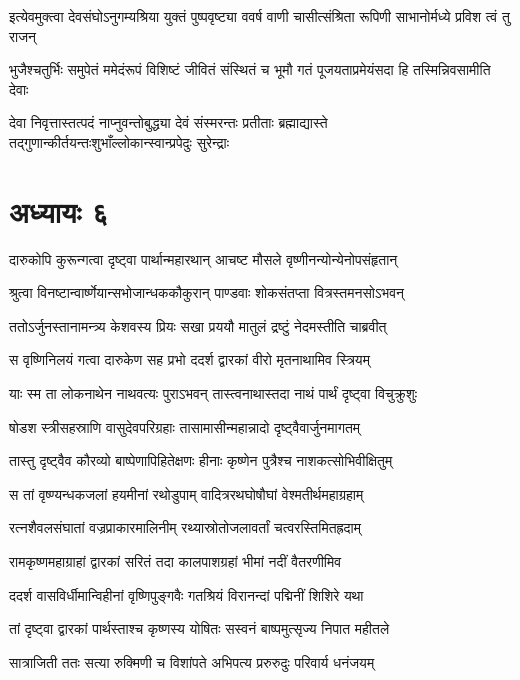 \twolineshloka
{इत्येवमुक्त्वा देवसंघोऽनुगम्यश्रिया युक्तं पुष्पवृष्ट्या ववर्ष}
{वाणी चासीत्संश्रिता रूपिणी साभानोर्मध्ये प्रविश त्वं तु राजन्}


\twolineshloka
{भुजैश्चतुर्भिः समुपेतं ममेदंरूपं विशिष्टं जीवितं संस्थितं च}
{भूमौ गतं पूजयताप्रमेयंसदा हि तस्मिन्निवसामीति देवाः}


\twolineshloka
{देवा निवृत्तास्तत्पदं नाप्नुवन्तोबुद्ध्या देवं संस्मरन्तः प्रतीताः}
{ब्रह्माद्यास्ते तद्गुणान्कीर्तयन्तःशुभाँल्लोकान्स्वान्प्रपेदुः सुरेन्द्राः}


\chapter{अध्यायः ६}
\twolineshloka
{दारुकोपि कुरून्गत्वा दृष्ट्वा पार्थान्महारथान्}
{आचष्ट मौसले वृष्णीनन्योन्येनोपसंहृतान्}


\twolineshloka
{श्रुत्वा विनष्टान्वार्ष्णेयान्सभोजान्धककौकुरान्}
{पाण्डवाः शोकसंतप्ता वित्रस्तमनसोऽभवन्}


\twolineshloka
{ततोऽर्जुनस्तानामन्त्र्य केशवस्य प्रियः सखा}
{प्रययौ मातुलं द्रष्टुं नेदमस्तीति चाब्रवीत्}


\twolineshloka
{स वृष्णिनिलयं गत्वा दारुकेण सह प्रभो}
{ददर्श द्वारकां वीरो मृतनाथामिव स्त्रियम्}


\twolineshloka
{याः स्म ता लोकनाथेन नाथवत्यः पुराऽभवन्}
{तास्त्वनाथास्तदा नाथं पार्थं दृष्ट्वा विचुक्रुशुः}


\twolineshloka
{षोडश स्त्रीसहस्राणि वासुदेवपरिग्रहाः}
{तासामासीन्महान्नादो दृष्ट्वैवार्जुनमागतम्}


\twolineshloka
{तास्तु दृष्ट्वैव कौरव्यो बाष्पेणापिहितेक्षणः}
{हीनाः कृष्णेन पुत्रैश्च नाशकत्सोभिवीक्षितुम्}


\twolineshloka
{स तां वृष्ण्यन्धकजलां हयमीनां रथोडुपाम्}
{वादित्ररथघोषौघां वेश्मतीर्थमहाग्रहाम्}


\twolineshloka
{रत्नशैवलसंघातां वज्रप्राकारमालिनीम्}
{रथ्यास्रोतोजलावर्तां चत्वरस्तिमितह्रदाम्}


\twolineshloka
{रामकृष्णमहाग्राहां द्वारकां सरितं तदा}
{कालपाशग्रहां भीमां नदीं वैतरणीमिव}


\threelineshloka
{ददर्श वासविर्धीमान्विहीनां वृष्णिपुङ्गवैः}
{गतश्रियं विरानन्दां पद्मिनीं शिशिरे यथा}
{}


\twolineshloka
{तां दृष्ट्वा द्वारकां पार्थस्ताश्च कृष्णस्य योषितः}
{सस्वनं बाष्पमुत्सृज्य निपात महीतले}


\twolineshloka
{सात्राजिती ततः सत्या रुक्मिणी च विशांपते}
{अभिपत्य प्ररुरुदुः परिवार्य धनंजयम्}



